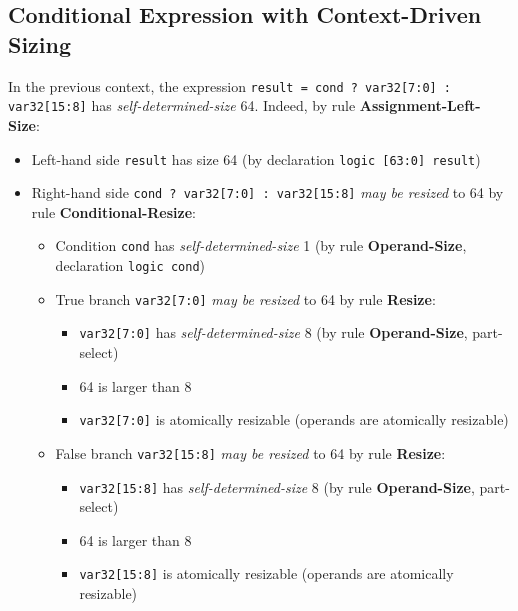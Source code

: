 \documentclass{article}
\newcommand{\sv}[1]{\texttt{#1}}
\newcommand{\sds}{\emph{self-determined-size}}
\newcommand{\mbr}{\emph{may be resized}}
\begin{document}
\subsection{Conditional Expression with Context-Driven Sizing}

In the previous context, the expression
\sv{result = cond ? var32[7:0] : var32[15:8]} has \sds{}
64. Indeed, by rule \textbf{Assignment-Left-Size}:

\begin{itemize}
  \item Left-hand side \sv{result} has size 64 (by declaration
    \sv{logic [63:0] result})
  \item Right-hand side \sv{cond ? var32[7:0] : var32[15:8]}
    \mbr{} to 64 by rule \textbf{Conditional-Resize}:
    \begin{itemize}
      \item Condition \sv{cond} has \sds{} 1 (by rule
        \textbf{Operand-Size}, declaration \sv{logic cond})
      \item True branch \sv{var32[7:0]} \mbr{} to 64 by rule
        \textbf{Resize}:
        \begin{itemize}
          \item \sv{var32[7:0]} has \sds{} 8 (by rule
            \textbf{Operand-Size}, part-select)
          \item 64 is larger than 8
          \item \sv{var32[7:0]} is atomically resizable (operands are
            atomically resizable)
        \end{itemize}
      \item False branch \sv{var32[15:8]} \mbr{} to 64 by
        rule \textbf{Resize}:
        \begin{itemize}
          \item \sv{var32[15:8]} has \sds{} 8 (by rule
            \textbf{Operand-Size}, part-select)
          \item 64 is larger than 8
          \item \sv{var32[15:8]} is atomically resizable (operands are
            atomically resizable)
        \end{itemize}
    \end{itemize}
\end{itemize}
\end{document}
